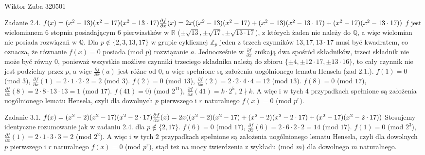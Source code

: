 \documentclass{article}
\begin{document}
Wiktor Zuba 320501
\newline

Zadanie 2.4.
\newline
\newline
$f(x)=(x^2-13)(x^2-17)(x^2-13\cdot 17)\newline
\frac{\partial f}{\partial x}(x)=2x((x^2-13)(x^2-17)+(x^2-13)(x^2-13\cdot 17)+(x^2-17)(x^2-13\cdot 17))\newline$
$f$ jest wielomianem 6 stopnia posiadającym 6 pierwiastków w $\mathbb{R}$ ($\pm\sqrt{13},\pm\sqrt{17},\pm\sqrt{13\cdot 17}$), z których żaden nie należy do $\mathbb{Q}$,
a więc wielomian nie posiada rozwiązań w $\mathbb{Q}$.\newline
Dla $p\notin\{2,3,13,17\}$ w grupie cyklicznej $\mathbb{Z}_p$ jeden z trzech czynników $13,17,13\cdot 17$ musi być kwadratem, co oznacza, że równanie $f(x)=0$ posiada (mod $p$) rozwiązanie $a$.\newline
Jednocześnie w $\frac{\partial f}{\partial x}$ znikają dwa spośród składników, trzeci składnik nie może być równy $0$,
ponieważ wszystkie możliwe czynniki trzeciego składnika należą do zbioru $\{\pm4,\pm 12\cdot 17,\pm 13\cdot 16\}$,
to cały czynnik nie jest podzielny przez $p$, a więc $\frac{\partial f}{\partial x}(a)$ jest różne od $0$, a więc spełnione są założenia uogólnionego lematu Hensela (zad 2.1.).\newline
$f(1)=0$ (mod $3$), $\frac{\partial f}{\partial x}(1)=2\cdot1\cdot2\cdot2=2$ (mod $3$).\newline
$f(2)=0$ (mod $13$), $\frac{\partial f}{\partial x}(2)=2\cdot2\cdot4\cdot4=12$ (mod $13$).\newline
$f(8)=0$ (mod $17$), $\frac{\partial f}{\partial x}(8)=2\cdot8\cdot13\cdot13=1$ (mod $17$).\newline
$f(41)=0)$ (mod $2^11$), $\frac{\partial f}{\partial x}(41)=k\cdot 2^5$, $2\nmid k$.\newline
A więc i w tych 4 przypadkach spełnione są założenia uogólnionego lematu Hensela, czyli dla dowolnych $p$ pierwszego i $r$ naturalnego $f(x)=0$ (mod $p^r$).
\newline

Zadanie 3.1.
\newline
\newline
$f(x)=(x^2-2)(x^2-17)(x^2-2\cdot 17)\newline
\frac{\partial f}{\partial x}(x)=2x((x^2-2)(x^2-17)+(x^2-2)(x^2-2\cdot 17)+(x^2-17)(x^2-2\cdot 17))\newline$
Stosujemy identyczne rozumowanie jak w zadaniu 2.4. dla $p\notin\{2,17\}$.
$f(6)=0$ (mod $17$), $\frac{\partial f}{\partial x}(6)=2\cdot6\cdot2\cdot2=14$ (mod $17$).\newline
$f(1)=0$ (mod $2^3$), $\frac{\partial f}{\partial x}(1)=2\cdot 1\cdot3\cdot3=2$ (mod $2^2$).\newline
A więc i w tych 2 przypadkach spełnione są założenia uogólnionego lematu Hensela, czyli dla dowolnych $p$ pierwszego i $r$ naturalnego $f(x)=0$ (mod $p^r$),
stąd też na mocy twierdzenia z wykładu (mod $m$) dla dowolnego $m$ naturalnego.
\newline
\end{document}
